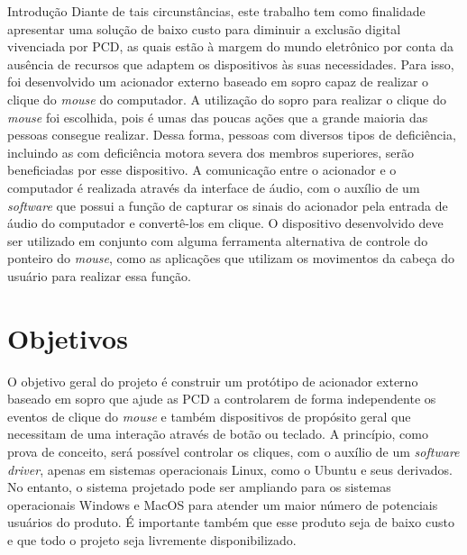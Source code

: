 \begin{chapter}{Introdução}
\vspace{-0.15cm}
Diante de tais circunstâncias, este trabalho tem como finalidade apresentar  uma
solução de baixo custo para diminuir a exclusão digital vivenciada por PCD, 
as quais estão à margem do mundo eletrônico por conta da ausência de recursos 
que adaptem os dispositivos às suas necessidades. Para isso, foi desenvolvido 
um acionador externo baseado em sopro capaz de realizar o clique do 
\textit{mouse} do computador. A utilização do sopro para realizar o clique do
\textit{mouse} foi escolhida, pois é umas das poucas ações que a grande maioria
das pessoas consegue realizar.  Dessa forma, pessoas com diversos tipos de
deficiência, incluindo as com deficiência motora severa dos  membros superiores,
serão beneficiadas por esse dispositivo. A comunicação entre o acionador e o
computador é realizada através da interface de áudio, com o auxílio de um
\textit{software} que possui a função de capturar os sinais do acionador pela
entrada de áudio do computador e convertê-los em clique. O dispositivo
desenvolvido deve ser utilizado em conjunto com alguma ferramenta alternativa de
controle do ponteiro do \textit{mouse}, como as aplicações que utilizam os
movimentos da cabeça do usuário para realizar essa função. 


\section{Objetivos}

O objetivo geral do projeto é construir um protótipo de acionador externo
baseado em sopro que ajude as PCD a controlarem de forma independente os eventos
de clique do \textit{mouse} e também dispositivos de propósito geral que
necessitam de uma interação através de botão ou teclado. A princípio, como prova
de conceito, será possível controlar os cliques, com o auxílio de um
\textit{software driver}, apenas em sistemas operacionais Linux, como o Ubuntu e
seus derivados. No entanto, o sistema projetado pode ser ampliando para os
sistemas operacionais Windows e MacOS para atender um maior número de potenciais
usuários do produto. É importante também que esse produto seja de baixo custo e
que todo o projeto seja livremente disponibilizado.%



\end{chapter}
